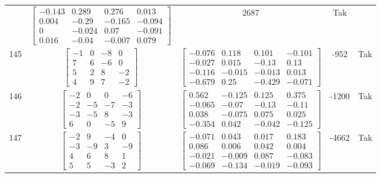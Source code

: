 \documentclass[a4paper,12pt]{article}
\begin{document}
\begin{tabular}{c c c c c}
&
$\begin{bmatrix} -0.143 & 0.289 & 0.276 & 0.013 \\ 0.004 & -0.29 & -0.165 & -0.094 \\ 0 & -0.024 & 0.07 & -0.091 \\ 0.016 & -0.04 & -0.007 & 0.079 \end{bmatrix}$
&
2687
&
Tak
\\
145
&
$\begin{bmatrix} -1 & 0 & -8 & 0 \\ 7 & 6 & -6 & 0 \\ 5 & 2 & 8 & -2 \\ 4 & 9 & 7 & -2 \end{bmatrix}$
&
$\begin{bmatrix} -0.076 & 0.118 & 0.101 & -0.101 \\ -0.027 & 0.015 & -0.13 & 0.13 \\ -0.116 & -0.015 & -0.013 & 0.013 \\ -0.679 & 0.25 & -0.429 & -0.071 \end{bmatrix}$
&
-952
&
Tak
\\
146
&
$\begin{bmatrix} -2 & 0 & 0 & -6 \\ -2 & -5 & -7 & -3 \\ -3 & -5 & 8 & -3 \\ 6 & 0 & -5 & 9 \end{bmatrix}$
&
$\begin{bmatrix} 0.562 & -0.125 & 0.125 & 0.375 \\ -0.065 & -0.07 & -0.13 & -0.11 \\ 0.038 & -0.075 & 0.075 & 0.025 \\ -0.354 & 0.042 & -0.042 & -0.125 \end{bmatrix}$
&
-1200
&
Tak
\\
147
&
$\begin{bmatrix} -2 & 9 & -4 & 0 \\ -3 & -9 & 3 & -9 \\ 4 & 6 & 8 & 1 \\ 5 & 5 & -3 & 2 \end{bmatrix}$
&
$\begin{bmatrix} -0.071 & 0.043 & 0.017 & 0.183 \\ 0.086 & 0.006 & 0.042 & 0.004 \\ -0.021 & -0.009 & 0.087 & -0.083 \\ -0.069 & -0.134 & -0.019 & -0.093 \end{bmatrix}$
&
-4662
&
Tak
\\

\end{tabular}
\end{document}
